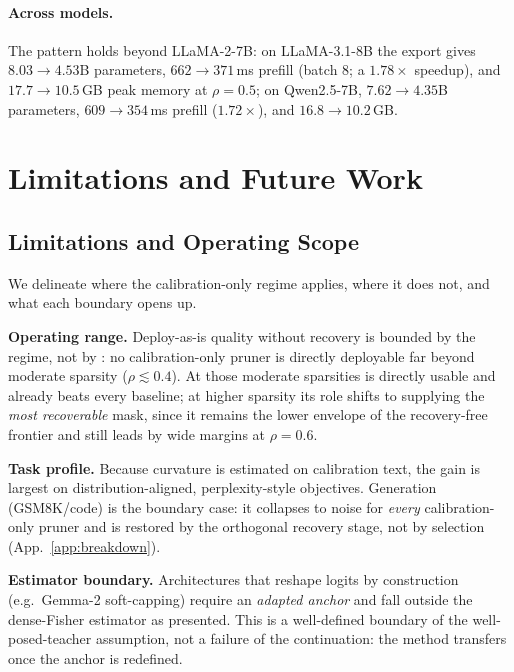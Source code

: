 \paragraph{Across models.} The pattern holds beyond LLaMA-2-7B: on LLaMA-3.1-8B the export gives
$8.03\!\to\!4.53$B parameters, $662\!\to\!371$\,ms prefill (batch $8$; a $1.78\times$ speedup), and
$17.7\!\to\!10.5$\,GB peak memory at $\rho{=}0.5$; on Qwen2.5-7B, $7.62\!\to\!4.35$B parameters,
$609\!\to\!354$\,ms prefill ($1.72\times$), and $16.8\!\to\!10.2$\,GB. 

\section{Limitations and Future Work}\label{app:plimits}

\subsection{Limitations and Operating Scope}
\label{app:scope}
We delineate where the calibration-only regime applies, where it does not, and what each boundary opens up.

\textbf{Operating range.} Deploy-as-is quality without recovery is bounded by the regime, not by \method:
no calibration-only pruner is directly deployable far beyond moderate sparsity ($\rho\lesssim0.4$). At those
moderate sparsities \method is directly usable and already beats every baseline; at higher sparsity its role
shifts to supplying the \emph{most recoverable} mask, since it remains the lower envelope of the
recovery-free frontier and still leads by wide margins at $\rho{=}0.6$.

\textbf{Task profile.} Because curvature is estimated on calibration text, the gain is largest on
distribution-aligned, perplexity-style objectives. Generation (GSM8K/code) is the boundary case: it
collapses to noise for \emph{every} calibration-only pruner and is restored by the orthogonal recovery
stage, not by selection (App.~\ref{app:breakdown}).

\textbf{Estimator boundary.} Architectures that reshape logits by construction (e.g.\ Gemma-2
soft-capping) require an \emph{adapted anchor} and fall outside the dense-Fisher estimator as presented.
This is a well-defined boundary of the well-posed-teacher assumption, not a failure of the continuation: the
method transfers once the anchor is redefined.

